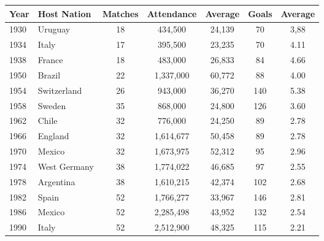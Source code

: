 \begin{figure}[H]
\small
\begin{tabular}{l l c c c c c}
Year & Host Nation & Matches & Attendance & Average & Goals & Average \\ \hline
1930 & Uruguay & 18 & 434,500 & 24,139 & 70 & 3,88 \\
1934 & Italy & 17 & 395,500 & 23,235 & 70 & 4.11\\
1938 & France & 18 & 483,000 & 26,833 & 84 & 4.66 \\
1950 & Brazil & 22 & 1,337,000 & 60,772 & 88 & 4.00 \\
1954 & Switzerland & 26 & 943,000 & 36,270 & 140 & 5.38 \\
1958 & Sweden & 35 & 868,000 & 24,800 & 126 & 3.60 \\
1962 & Chile & 32 & 776,000 & 24,250 & 89 & 2.78 \\
1966 & England & 32 & 1,614,677 & 50,458 & 89 & 2.78 \\
1970 & Mexico & 32 & 1,673,975 & 52,312 & 95 & 2.96 \\
1974 & West Germany & 38 & 1,774,022 & 46,685 & 97 & 2.55 \\
1978 & Argentina & 38 & 1,610,215 & 42,374 & 102 & 2.68 \\
1982 & Spain & 52 & 1,766,277 & 33,967 & 146 & 2.81 \\
1986 & Mexico & 52 & 2,285,498 & 43,952 & 132 & 2.54 \\
1990 & Italy & 52 & 2,512,900 & 48,325 & 115 & 2.21 \\ \hline
\end{tabular}
\normalsize
\end{figure}
